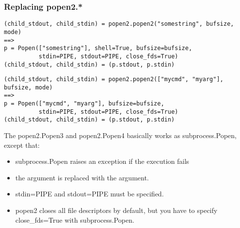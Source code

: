 \subsubsection{Replacing popen2.*}


\begin{verbatim}
(child_stdout, child_stdin) = popen2.popen2("somestring", bufsize, mode)
==>
p = Popen(["somestring"], shell=True, bufsize=bufsize,
          stdin=PIPE, stdout=PIPE, close_fds=True)
(child_stdout, child_stdin) = (p.stdout, p.stdin)
\end{verbatim}

\begin{verbatim}
(child_stdout, child_stdin) = popen2.popen2(["mycmd", "myarg"], bufsize, mode)
==>
p = Popen(["mycmd", "myarg"], bufsize=bufsize,
          stdin=PIPE, stdout=PIPE, close_fds=True)
(child_stdout, child_stdin) = (p.stdout, p.stdin)
\end{verbatim}

The popen2.Popen3 and popen2.Popen4 basically works as subprocess.Popen,
except that:

\begin{itemize}
\item subprocess.Popen raises an exception if the execution fails

\item the  argument is replaced with the 
      argument.

\item stdin=PIPE and stdout=PIPE must be specified.

\item popen2 closes all file descriptors by default, but you have to
      specify close_fds=True with subprocess.Popen.
\end{itemize}

